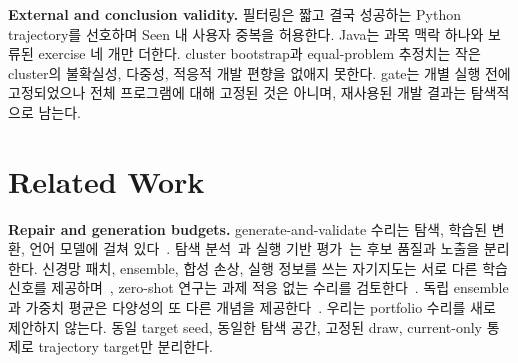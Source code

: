\documentclass[10pt,conference]{IEEEtran}
\begin{document}
\noindent\textbf{External and conclusion validity.} 필터링은 짧고 결국 성공하는 Python trajectory를 선호하며 Seen 내 사용자 중복을 허용한다. Java는 과목 맥락 하나와 보류된 exercise 네 개만 더한다. cluster bootstrap과 equal-problem 추정치는 작은 cluster의 불확실성, 다중성, 적응적 개발 편향을 없애지 못한다. gate는 개별 실행 전에 고정되었으나 전체 프로그램에 대해 고정된 것은 아니며, 재사용된 개발 결과는 탐색적으로 남는다.

\section{Related Work}
\label{sec:related}
\noindent\textbf{Repair and generation budgets.} generate-and-validate 수리는 탐색, 학습된 변환, 언어 모델에 걸쳐 있다~\cite{gazzola2019automatic,monperrus2018automatic,weimer2009automatically,legoues2012genprog}. 탐색 분석~\cite{qi2014strength}과 실행 기반 평가~\cite{haque2023fixeval,chen2021evaluating}는 후보 품질과 노출을 분리한다. 신경망 패치, ensemble, 합성 손상, 실행 정보를 쓰는 자기지도는 서로 다른 학습 신호를 제공하며~\cite{tufano2019empirical,lutellier2020coconut,yasunaga2021break,ye2022selfapr}, zero-shot 연구는 과제 적응 없는 수리를 검토한다~\cite{xia2022less,jiang2023impact}. 독립 ensemble과 가중치 평균은 다양성의 또 다른 개념을 제공한다~\cite{lakshminarayanan2017simple,wortsman2022model}. 우리는 portfolio 수리를 새로 제안하지 않는다. 동일 target seed, 동일한 탐색 공간, 고정된 draw, current-only 통제로 trajectory target만 분리한다.
\end{document}
